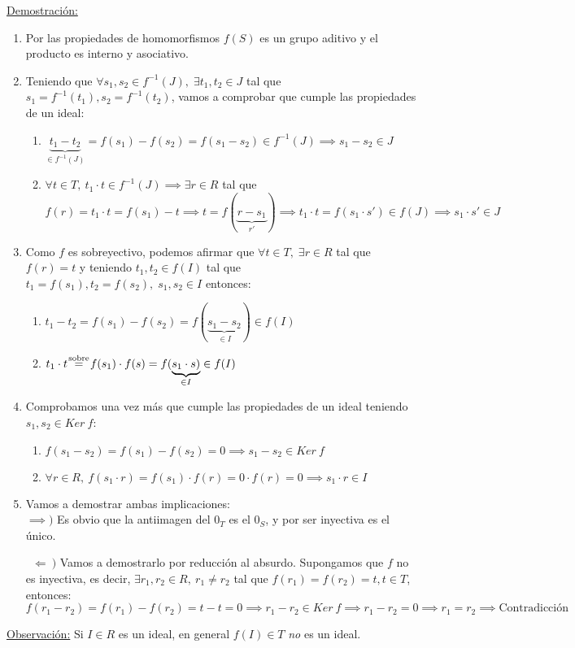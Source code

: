 \documentclass[10pt, a4paper]{article}
\newcommand{\eqc}[1]{\stackrel{\mathclap{\normalfont\mbox{\scriptsize{#1}}}}{=}}
\newcommand{\obs}{\underline{Observación:} }
\newcommand{\demo}{\underline{Demostración:} }
\newenvironment{enumerater}{\begin{enumerate}[label=\roman*)]}
{\end{enumerate}}
\newenvironment{enumeratea}{\begin{enumerate}[label=\arabic*)]}
{\end{enumerate}}
\begin{document}
\demo 
\begin{enumeratea}
	\item Por las propiedades de homomorfismos $f(S)$ es un grupo aditivo y el producto es interno y asociativo.
	\item Teniendo que $\forall s_1, s_2 \in f^{-1}(J), \; \exists t_1, t_2 \in J$ tal que $s_1 = f^{-1}(t_1), s_2 = f^{-1}(t_2)$, vamos a comprobar que cumple las propiedades de un ideal:
	\begin{enumerater}
		\item $\underbrace{t_1 - t_2}_{\in f^{-1}(J)} = f(s_1) - f(s_2) = f(s_1 - s_2) \in f^{-1}(J) \implies s_1 - s_2 \in J$
		\item $\forall t \in T,\ t_1 \cdot t \in f^{-1}(J) \implies \exists r \in R$ tal que $f(r) = t_1 \cdot t = f(s_1) - t \implies t = f(\underbrace{r - s_1}_{r'}) \implies t_1 \cdot t = f(s_1 \cdot s') \in f(J) \implies s_1 \cdot s' \in J$
	\end{enumerater}
	\item Como $f$ es sobreyectivo, podemos afirmar que $\forall t \in T, \;\exists r \in R$ tal que $f(r) = t$ y teniendo $t_1, t_2 \in f(I)$ tal que $t_1 = f(s_1), t_2 = f(s_2),\; s_1, s_2 \in I$ entonces:
	\begin{enumerater}
		\item $t_1 - t_2 = f(s_1) - f(s_2) = f(\underbrace{s_1 - s_2}_{\in I}) \in f(I)$
		\item $t_1 \cdot t \ \eqc{sobre} \  f(s_1) \cdot f(s) = f(\underbrace{s_1 \cdot s)}_{\in I} \in f(I)$
	\end{enumerater}
	\item Comprobamos una vez más que cumple las propiedades de un ideal teniendo $s_1, s_2 \in Ker\ f$:
	\begin{enumerater}
		\item $f(s_1 - s_2) = f(s_1) - f(s_2) = 0 \implies s_1 - s_2 \in Ker\ f$
		\item $\forall r \in R,\ f(s_1 \cdot r) = f(s_1) \cdot f(r) = 0 \cdot f(r) = 0 \implies s_1 \cdot r \in I$
	\end{enumerater}
	\item Vamos a demostrar ambas implicaciones: \\
	\indent $\implies )$ Es obvio que la antiimagen del $0_T$ es el $0_S$, y por ser inyectiva es el único.

	\indent \ $\Longleftarrow\ )$ Vamos a demostrarlo por reducción al absurdo. Supongamos que $f$ no es inyectiva, es decir, $\exists r_1, r_2 \in R,\ r_1 \neq r_2$ tal que $f(r_1) = f(r_2) = t, t \in T$, entonces:
	\[
	f(r_1 - r_2) = f(r_1) - f(r_2) = t - t = 0 \implies r_1 - r_2 \in Ker\ f \implies r_1 - r_2 = 0 \implies r_1 = r_2 \implies \text{Contradicción}
	\]
\end{enumeratea}
\obs Si $I \in R$ es un ideal, en general $f(I) \in T$ \emph{no} es un ideal.
\end{document}
